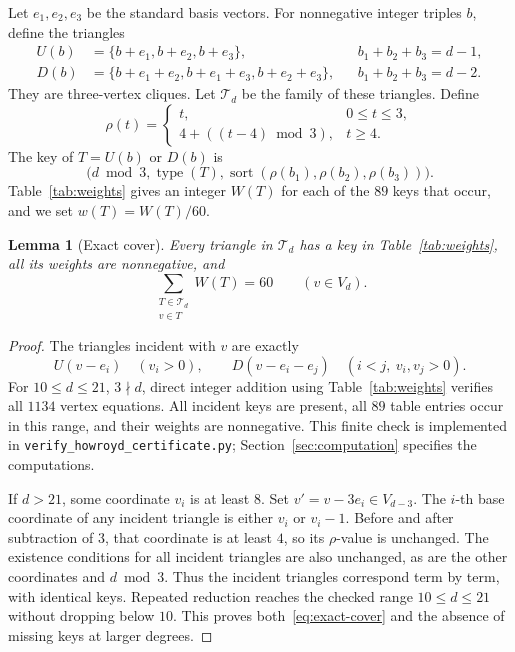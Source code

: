 \documentclass[11pt]{article}
\newtheorem{lemma}[theorem]{Lemma}
\begin{document}
Let \(e_1,e_2,e_3\) be the standard basis vectors. For nonnegative
integer triples \(b\), define the triangles
\[
 \begin{aligned}
 U(b)&=\{b+e_1,b+e_2,b+e_3\},
       &&b_1+b_2+b_3=d-1,\\
 D(b)&=\{b+e_1+e_2,b+e_1+e_3,b+e_2+e_3\},
       &&b_1+b_2+b_3=d-2.
 \end{aligned}
\]
They are three-vertex cliques. Let \(\mathcal T_d\) be the family of
these triangles. Define
\[
 \rho(t)=
 \begin{cases}
 t,&0\leq t\leq3,\\
 4+((t-4)\bmod3),&t\geq4.
 \end{cases}
\]
The key of \(T=U(b)\) or \(D(b)\) is
\[
 \bigl(d\bmod3,\operatorname{type}(T),
       \operatorname{sort}(\rho(b_1),\rho(b_2),\rho(b_3))\bigr).
\]
Table~\ref{tab:weights} gives an integer \(W(T)\) for each of the
\(89\) keys that occur, and we set \(w(T)=W(T)/60\).

\begin{lemma}[Exact cover]\label{lem:cover}
Every triangle in \(\mathcal T_d\) has a key in
Table~\ref{tab:weights}, all its weights are nonnegative, and
\begin{equation}\label{eq:exact-cover}
 \sum_{\substack{T\in\mathcal T_d\\v\in T}}W(T)=60
 \qquad(v\in V_d).
\end{equation}
\end{lemma}

\begin{proof}
The triangles incident with \(v\) are exactly
\[
 U(v-e_i)\quad(v_i>0),\qquad
 D(v-e_i-e_j)\quad(i<j,\ v_i,v_j>0).
\]
For \(10\leq d\leq21\), \(3\nmid d\), direct integer addition using
Table~\ref{tab:weights} verifies all \(1134\) vertex equations.
All incident keys are present, all \(89\) table entries occur in this
range, and their weights are nonnegative. This finite check is
implemented in \texttt{verify\_howroyd\_certificate.py};
Section~\ref{sec:computation} specifies the computations.

If \(d>21\), some coordinate \(v_i\) is at least \(8\).
Set \(v'=v-3e_i\in V_{d-3}\).
The \(i\)-th base coordinate of any incident triangle is either \(v_i\)
or \(v_i-1\). Before and after subtraction of \(3\), that coordinate
is at least \(4\), so its \(\rho\)-value is unchanged.
The existence conditions for all incident triangles are also
unchanged, as are the other coordinates and \(d\bmod3\).
Thus the incident triangles correspond term by term, with identical
keys. Repeated reduction reaches the checked range
\(10\leq d\leq21\) without dropping below \(10\).
This proves both~\eqref{eq:exact-cover} and the absence of missing
keys at larger degrees.
\end{proof}
\end{document}
